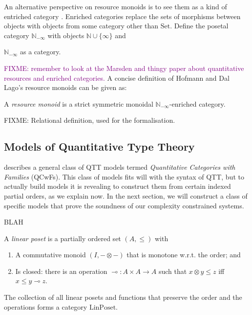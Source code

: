 \documentclass[acmsmall,review]{acmart}
\newcommand{\natinf}{\mathbb{N}_{-\infty}}
\newcommand{\Set}{\mathrm{Set}}
\newcommand{\LinPoset}{\mathrm{LinPoset}}
\newcommand{\bob}[1]{\textcolor{purple}{FIXME: #1}}
\begin{document}
An alternative perspective on resource monoids is to see them as a
kind of entriched category \cite{kelly}. Enriched categories replace
the sets of morphisms between objects with objects from some category
other than $\Set$. Define the posetal category $\natinf$ with objects $\mathbb{N} \cup \{\infty\}$ and

$\natinf$ as a category.

\bob{remember to look at the Marsden and thingy paper about
  quantitative resources and enriched categories.}  A concise
definition of Hofmann and Dal Lago's resource monoids can be given as:
\begin{definition}
  A \emph{resource monoid} is a strict symmetric monoidal
  $\natinf$-enriched category.
\end{definition}

FIXME: Relational definition, used for the formalisation.

\subsection{Models of Quantitative Type Theory}
\label{sec:qtt-models}

\cite{atkey18} describes a general class of QTT models termed
\emph{Quantitative Categories with Families} (QCwFs). This class of
models fits will with the syntax of QTT, but to actually build models
it is revealing to construct them from certain indexed partial orders,
as we explain now. In the next section, we will construct a class of
specific models that prove the soundness of our complexity constrained
systems.

\begin{definition}
  BLAH
\end{definition}

\begin{definition}
  A \emph{linear poset} is a partially ordered set $(A, \leq)$ with
  \begin{enumerate}
  \item A commutative monoid $(I, -\otimes-)$ that is monotone
    w.r.t. the order; and
  \item Is closed: there is an operation
    $\multimap : A \times A \to A$ such that $x \otimes y \leq z$ iff
    $x \leq y \multimap z$.
  \end{enumerate}
  The collection of all linear posets and functions that preserve the
  order and the operations forms a category $\LinPoset$.
\end{definition}
\end{document}
